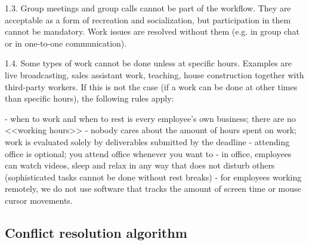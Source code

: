 \documentclass[11pt]{article}
\theoremstyle{remark}
\theoremstyle{definition}
\begin{document}
\item[1.3.] Group meetings and group calls cannot be part of the workflow. They are acceptable as a form of recreation and socialization, but participation in them cannot be mandatory. Work issues are resolved without them (e.g. in group chat or in one-to-one communication).

\item[1.4.] Some types of work cannot be done unless at specific hours. Examples are live broadcasting, sales assistant work, teaching, house construction together with third-party workers. If this is not the case (if a work can be done at other times than specific hours), the following rules apply:

- when to work and when to rest is every employee's own business; there are no <<working hours>>
- nobody cares about the amount of hours spent on work; work is evaluated solely by deliverables submitted by the deadline
- attending office is optional; you attend office whenever you want to 
- in office, employees can watch videos, sleep and relax in any way that does not disturb others (sophisticated tasks cannot be done without rest breaks)
- for employees working remotely, we do not use software that tracks the amount of screen time or mouse cursor movements. 

























\subsection{Conflict resolution algorithm}
\end{document}
